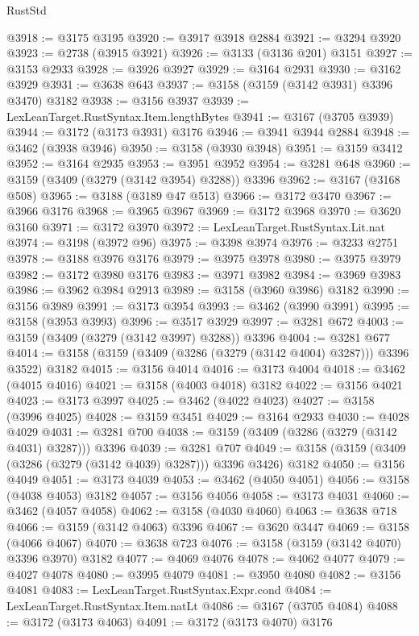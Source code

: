\begin{lexlean}{RustStd}
\begin{coremodule}
@3918 := @3175 @3195
@3920 := @3917 @3918 @2884
@3921 := @3294 @3920
@3923 := @2738 (@3915 @3921)
@3926 := @3133 (@3136 @201) @3151
@3927 := @3153 @2933
@3928 := @3926 @3927
@3929 := @3164 @2931
@3930 := @3162 @3929
@3931 := @3638 @643
@3937 := @3158 (@3159 (@3142 @3931) @3396 @3470) @3182
@3938 := @3156 @3937
@3939 := LexLeanTarget.RustSyntax.Item.lengthBytes
@3941 := @3167 (@3705 @3939)
@3944 := @3172 (@3173 @3931) @3176
@3946 := @3941 @3944 @2884
@3948 := @3462 (@3938 @3946)
@3950 := @3158 (@3930 @3948)
@3951 := @3159 @3412
@3952 := @3164 @2935
@3953 := @3951 @3952
@3954 := @3281 @648
@3960 := @3159 (@3409 (@3279 (@3142 @3954) @3288)) @3396
@3962 := @3167 (@3168 @508)
@3965 := @3188 (@3189 @47 @513)
@3966 := @3172 @3470
@3967 := @3966 @3176
@3968 := @3965 @3967
@3969 := @3172 @3968
@3970 := @3620 @3160
@3971 := @3172 @3970
@3972 := LexLeanTarget.RustSyntax.Lit.nat
@3974 := @3198 (@3972 @96)
@3975 := @3398 @3974
@3976 := @3233 @2751
@3978 := @3188 @3976 @3176
@3979 := @3975 @3978
@3980 := @3975 @3979
@3982 := @3172 @3980 @3176
@3983 := @3971 @3982
@3984 := @3969 @3983
@3986 := @3962 @3984 @2913
@3989 := @3158 (@3960 @3986) @3182
@3990 := @3156 @3989
@3991 := @3173 @3954
@3993 := @3462 (@3990 @3991)
@3995 := @3158 (@3953 @3993)
@3996 := @3517 @3929
@3997 := @3281 @672
@4003 := @3159 (@3409 (@3279 (@3142 @3997) @3288)) @3396
@4004 := @3281 @677
@4014 := @3158 (@3159 (@3409 (@3286 (@3279 (@3142 @4004) @3287))) @3396 @3522) @3182
@4015 := @3156 @4014
@4016 := @3173 @4004
@4018 := @3462 (@4015 @4016)
@4021 := @3158 (@4003 @4018) @3182
@4022 := @3156 @4021
@4023 := @3173 @3997
@4025 := @3462 (@4022 @4023)
@4027 := @3158 (@3996 @4025)
@4028 := @3159 @3451
@4029 := @3164 @2933
@4030 := @4028 @4029
@4031 := @3281 @700
@4038 := @3159 (@3409 (@3286 (@3279 (@3142 @4031) @3287))) @3396
@4039 := @3281 @707
@4049 := @3158 (@3159 (@3409 (@3286 (@3279 (@3142 @4039) @3287))) @3396 @3426) @3182
@4050 := @3156 @4049
@4051 := @3173 @4039
@4053 := @3462 (@4050 @4051)
@4056 := @3158 (@4038 @4053) @3182
@4057 := @3156 @4056
@4058 := @3173 @4031
@4060 := @3462 (@4057 @4058)
@4062 := @3158 (@4030 @4060)
@4063 := @3638 @718
@4066 := @3159 (@3142 @4063) @3396
@4067 := @3620 @3447
@4069 := @3158 (@4066 @4067)
@4070 := @3638 @723
@4076 := @3158 (@3159 (@3142 @4070) @3396 @3970) @3182
@4077 := @4069 @4076
@4078 := @4062 @4077
@4079 := @4027 @4078
@4080 := @3995 @4079
@4081 := @3950 @4080
@4082 := @3156 @4081
@4083 := LexLeanTarget.RustSyntax.Expr.cond
@4084 := LexLeanTarget.RustSyntax.Item.natLt
@4086 := @3167 (@3705 @4084)
@4088 := @3172 (@3173 @4063)
@4091 := @3172 (@3173 @4070) @3176

\end{coremodule}
\end{lexlean}
